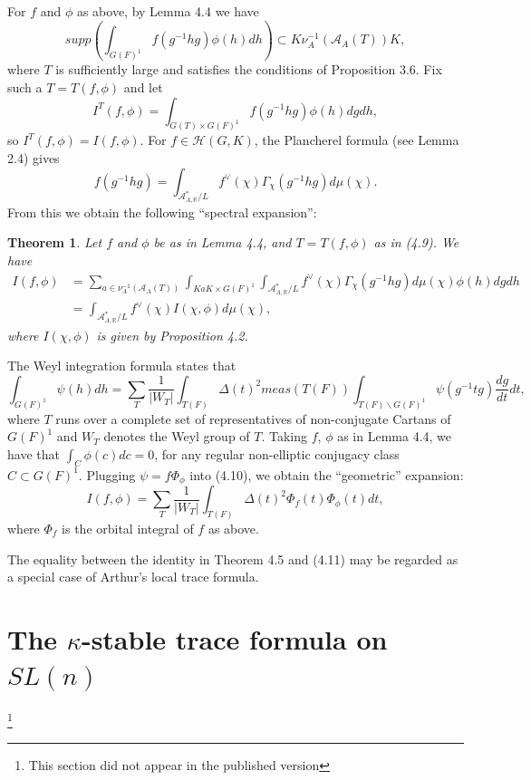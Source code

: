 \documentclass[12pt]{article}
\newtheorem{theorem}[lemma]{Theorem}
\begin{document}
For $f$ and $\phi$ as above, by Lemma 4.4 we have
\begin{equation}\tag{4.9}
supp(\int_{G(F)^1}f(g^{-1}hg)\phi(h)dh)\subset K\nu_A^{-1}(\mathcal{A}_A(T))K,
\end{equation}
where $T$ is sufficiently large and satisfies the conditions of Proposition 3.6. Fix such a $T=T(f,\phi)$ and let
\[
I^T(f,\phi)=\int_{G(T)\times G(F)^1}f(g^{-1}hg)\phi(h)dgdh,
\]
so $I^T(f,\phi)=I(f,\phi)$. For $f\in\mathcal{H}(G,K)$, the Plancherel formula (see Lemma 2.4) gives
\[
f(g^{-1}hg)=\int_{\mathcal{A}^*_{A,\mathbb{R}}/L}f^\vee(\chi)\Gamma_\chi(g^{-1}hg)d\mu(\chi).
\]
From this we obtain the following ``spectral expansion'':

\begin{theorem}
Let $f$ and $\phi$ be as in Lemma 4.4, and $T=T(f,\phi)$ as in (4.9). We have
\[
\begin{array}{rl}
I(f,\phi)&=\sum_{a\in\nu_A^{-1}(\mathcal{A}_A(T))}\int_{KaK\times G(F)^1}\int_{\mathcal{A}^*_{A,\mathbb{R}}/L}f^\vee(\chi)\Gamma_\chi(g^{-1}hg)d\mu(\chi)\phi(h)dgdh\\
&=\int_{\mathcal{A}^*_{A,\mathbb{R}}/L}f^\vee(\chi)I(\chi,\phi)d\mu(\chi),
\end{array}
\]
where $I(\chi,\phi)$ is given by Proposition 4.2.
\end{theorem}

The Weyl integration formula states that
\begin{equation}\tag{4.10}
\int_{G(F)^1}\psi(h)dh=\sum_T\frac{1}{|W_T|}\int_{T(F)}\Delta(t)^2meas(T(F))\int_{T(F)\backslash G(F)^1}\psi(g^{-1}tg)\frac{dg}{dt}dt,
\end{equation}
where $T$ runs over a complete set of representatives of non-conjugate Cartans of $G(F)^1$ and $W_T$ denotes the Weyl group of $T$. Taking $f$, $\phi$ as in Lemma 4.4, we have that $\int_C\phi(c)dc=0$, for any regular non-elliptic conjugacy class $C\subset G(F)^1$. Plugging $\psi=f\Phi_\phi$ into (4.10), we obtain the ``geometric'' expansion:
\begin{equation}\tag{4.11}
I(f,\phi)=\sum_T\frac{1}{|W_T|}\int_{T(F)}\Delta(t)^2\Phi_f(t)\Phi_\phi(t)dt,
\end{equation}
where $\Phi_f$ is the orbital integral of $f$ as above.

The equality between the identity in Theorem 4.5 and (4.11) may be regarded as a special case of Arthur's local trace formula.

\section{The $\kappa$-stable trace formula on $SL(n)$}
\footnote{This section did not appear in the published version}
\end{document}

